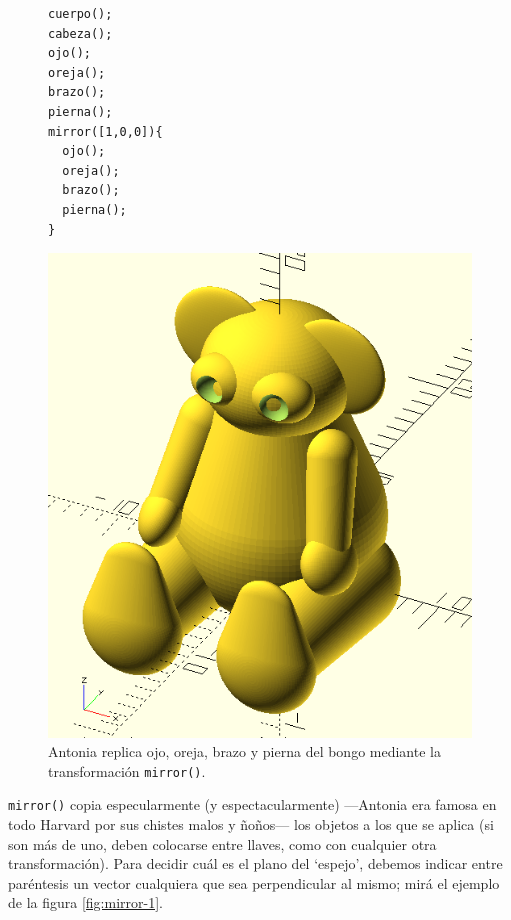   \begin{figure}[ht]
 \begin{minipage}[]{.4\textwidth}
   \begin{lstlisting}
cuerpo();
cabeza();
ojo();
oreja();
brazo();
pierna();
mirror([1,0,0]){
  ojo();
  oreja();
  brazo();
  pierna();
}
\end{lstlisting}
  \end{minipage}\hfill
  \begin{minipage}[]{.6\textwidth}
    \centering
      \includegraphics[width=\textwidth]{imagenes/bongo-casi-entero}
    \end{minipage}
    \caption{Antonia replica ojo, oreja, brazo y pierna del bongo
      mediante la transformación \lstinline!mirror()!.}
  \label{fig:bongo-casi-entero}
\end{figure}


\guillemotright \lstinline!mirror()! copia especularmente (y
espectacularmente) ---An\-to\-nia era famosa en todo Harvard por sus
chistes malos y ñoños--- los objetos a los que se aplica (si son más
de uno, deben colocarse entre llaves, como con cualquier otra
transformación). Para decidir cuál es el plano del `espejo', debemos
indicar entre paréntesis un vector cualquiera que sea perpendicular al
mismo; mirá el ejemplo de la figura \ref{fig:mirror-1}.

